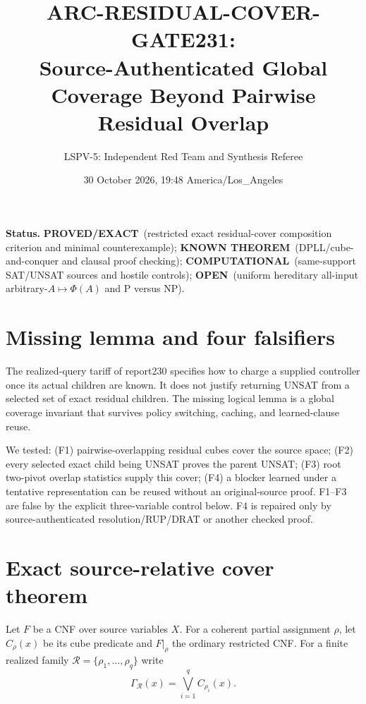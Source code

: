 \documentclass[11pt]{article}
\title{ARC-RESIDUAL-COVER-GATE231:\\Source-Authenticated Global Coverage Beyond Pairwise Residual Overlap}
\author{LSPV-5: Independent Red Team and Synthesis Referee}
\date{30 October 2026, 19:48 America/Los\_Angeles}
\newcommand{\OPEN}{\textbf{OPEN}}
\newcommand{\PROVED}{\textbf{PROVED/EXACT}}
\newcommand{\KNOWN}{\textbf{KNOWN THEOREM}}
\newcommand{\COMP}{\textbf{COMPUTATIONAL}}
\begin{document}
\maketitle

\noindent\textbf{Status.}
\PROVED\ (restricted exact residual-cover composition criterion and minimal
counterexample); \KNOWN\ (DPLL/cube-and-conquer and clausal proof checking);
\COMP\ (same-support SAT/UNSAT sources and hostile controls); \OPEN\
(uniform hereditary all-input arbitrary-$A\mapsto\Phi(A)$ and P versus NP).

\section{Missing lemma and four falsifiers}
The realized-query tariff of report230 specifies how to charge a supplied
controller once its actual children are known.  It does not justify returning
UNSAT from a selected set of exact residual children.  The missing logical
lemma is a global coverage invariant that survives policy switching, caching,
and learned-clause reuse.

We tested: (F1) pairwise-overlapping residual cubes cover the source space;
(F2) every selected exact child being UNSAT proves the parent UNSAT; (F3) root
two-pivot overlap statistics supply this cover; (F4) a blocker learned under a
tentative representation can be reused without an original-source proof.
F1--F3 are false by the explicit three-variable control below.  F4 is repaired
only by source-authenticated resolution/RUP/DRAT or another checked proof.

\section{Exact source-relative cover theorem}
Let $F$ be a CNF over source variables $X$.  For a coherent partial assignment
$\rho$, let $C_\rho(x)$ be its cube predicate and $F|_\rho$ the ordinary
restricted CNF.  For a finite realized family
$\mathcal R=\{\rho_1,\ldots,\rho_q\}$ write
\[
\Gamma_{\mathcal R}(x)=\bigvee_{i=1}^q C_{\rho_i}(x).
\]
\end{document}
